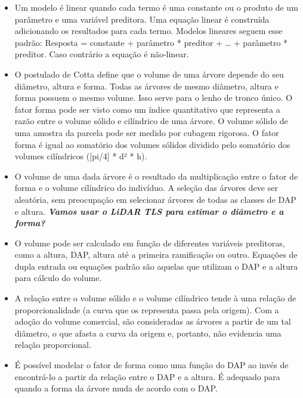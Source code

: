 \documentclass[
]{article}
\begin{document}
\begin{itemize}
\item
  Um modelo é linear quando cada termo é uma constante ou o produto de
  um parâmetro e uma variável preditora. Uma equação linear é construída
  adicionando os resultados para cada termo. Modelos lineares seguem
  esse padrão: Resposta = constante + parâmetro * preditor + \ldots{} +
  parâmetro * preditor. Caso contrário a equação é não-linear.
\item
  O postulado de Cotta define que o volume de uma árvore depende do seu
  diâmetro, altura e forma. Todas as árvores de mesmo diâmetro, altura e
  forma possuem o mesmo volume. Isso serve para o lenho de tronco único.
  O fator forma pode ser visto como um índice quantitativo que
  representa a razão entre o volume sólido e cilíndrico de uma árvore. O
  volume sólido de uma amostra da parcela pode ser medido por cubagem
  rigorosa. O fator forma é igual ao somatório dos volumes sólidos
  dividido pelo somatório dos volumes cilíndricos ({[}pi/4{]} * d² * h).
\item
  O volume de uma dada árvore é o resultado da multiplicação entre o
  fator de forma e o volume cilíndrico do indivíduo. A seleção das
  árvores deve ser aleatória, sem preocupação em selecionar árvores de
  todas as classes de DAP e altura. \textbf{\emph{Vamos usar o LiDAR TLS
  para estimar o diâmetro e a forma?}}
\item
  O volume pode ser calculado em função de diferentes variáveis
  preditoras, como a altura, DAP, altura até a primeira ramificação ou
  outro. Equações de dupla entrada ou equações padrão são aquelas que
  utilizam o DAP e a altura para cálculo do volume.
\item
  A relação entre o volume sólido e o volume cilíndrico tende à uma
  relação de proporcionalidade (a curva que os representa passa pela
  origem). Com a adoção do volume comercial, são consideradas as árvores
  a partir de um tal diâmetro, o que afasta a curva da origem e,
  portanto, não evidencia uma relação proporcional.
\item
  É possível modelar o fator de forma como uma função do DAP ao invés de
  encontrá-lo a partir da relação entre o DAP e a altura. É adequado
  para quando a forma da árvore muda de acordo com o DAP.
\end{itemize}
\end{document}
